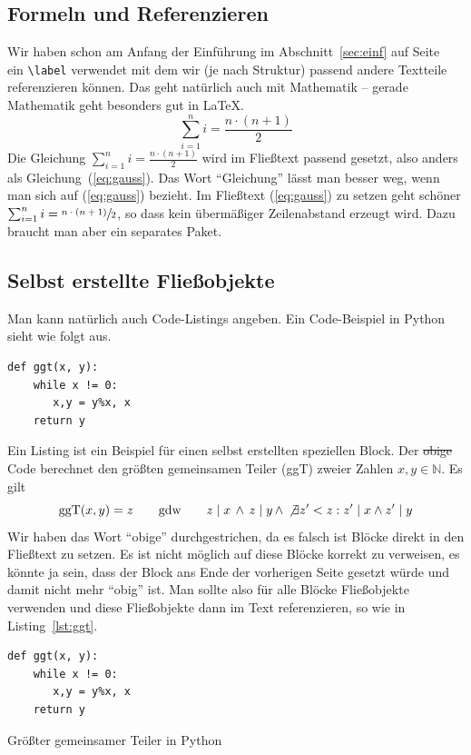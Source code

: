 \documentclass[11pt,a4paper]{article} %
\begin{document}
\subsection{Formeln und Referenzieren}

Wir haben schon am Anfang der Einführung im Abschnitt~\ref{sec:einf} 
auf Seite~\pageref{sec:einf} ein \verb|\label| verwendet mit dem wir
(je nach Struktur) passend andere Textteile referenzieren können.
Das geht natürlich auch mit Mathematik -- gerade Mathematik geht 
besonders gut in \LaTeX.
\begin{equation} \label{eq:gauss}
  \sum_{i=1}^n i = \frac{n \cdot (n+1)}{2}
\end{equation}
Die Gleichung $\sum_{i=1}^n i = \frac{n \cdot (n+1)}{2}$ wird
im Fließtext passend gesetzt, also anders als Gleichung~(\ref{eq:gauss}).
Das Wort "`Gleichung"' lässt man besser weg, wenn man
sich auf (\ref{eq:gauss}) bezieht.
Im Fließtext (\ref{eq:gauss}) zu setzen geht schöner
$\sum_{i=1}^n i = \sfrac{n \cdot (n+1)}{2}$, so dass kein übermäßiger
Zeilenabstand erzeugt wird.
Dazu braucht man aber ein separates Paket.


\subsection{Selbst erstellte Fließobjekte}

Man kann natürlich auch Code-Listings angeben.
Ein Code-Beispiel in Python sieht wie folgt aus.
\begin{lstlisting}
def ggt(x, y):
    while x != 0:
       x,y = y%x, x
    return y
\end{lstlisting}
Ein Listing ist ein Beispiel für einen selbst erstellten
speziellen Block.
Der \st{obige} Code berechnet den größten gemeinsamen Teiler (ggT)
zweier Zahlen $x, y \in \mathbb{N}$. Es gilt
\[
\mbox{ggT}(x, y) = z \qquad  \mbox{gdw} \qquad
z \mid x\, \wedge\, z \mid y\, \wedge\,
\not\exists z' < z: z' \mid x \wedge z' \mid y
\]
Wir haben das Wort "`obige"' durchgestrichen, da es falsch ist
Blöcke direkt in den Fließtext zu setzen.
Es ist nicht möglich auf diese Blöcke korrekt zu verweisen, es
könnte ja sein, dass der Block ans Ende der vorherigen Seite
gesetzt würde und damit nicht mehr "`obig"' ist.
Man sollte also für alle Blöcke Fließobjekte verwenden und
diese Fließobjekte dann im Text referenzieren,
so wie in Listing~\ref{lst:ggt}.
\begin{listing}
\begin{lstlisting}
def ggt(x, y):
    while x != 0:
       x,y = y%x, x
    return y
\end{lstlisting}
\caption{Größter gemeinsamer Teiler in Python}
\label{lst:ggt}
\end{listing}
\end{document}

